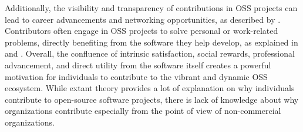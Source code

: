 \documentclass[CHICAGO,Times1COL]{WileyNJDv5} %
\begin{document}
Additionally, the visibility and transparency of contributions in OSS projects can lead to career advancements and networking opportunities, as described by \citet{Roberts_et_al2006}. Contributors often engage in OSS projects to solve personal or work-related problems, directly benefiting from the software they help develop, as explained in \citet{VonKrogh_and_VonHippel2006} and \citet{CrowstonWei_et_al2012}. Overall, the confluence of intrinsic satisfaction, social rewards, professional advancement, and direct utility from the software itself creates a powerful motivation for individuals to contribute to the vibrant and dynamic OSS ecosystem. While extant theory provides a lot of explanation on why individuals contribute to open-source software projects, there is lack of knowledge about why organizations contribute especially from the point of view of non-commercial organizations. 






 
  

\end{document}
